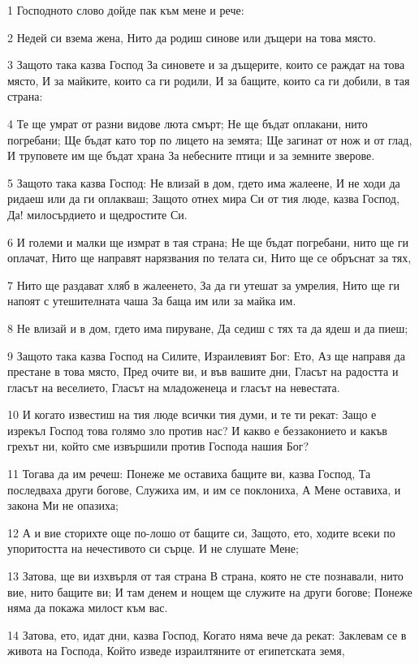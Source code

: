 \par 1 Господното слово дойде пак към мене и рече:
\par 2 Недей си взема жена, Нито да родиш синове или дъщери на това място.
\par 3 Защото така казва Господ За синовете и за дъщерите, които се раждат на това място, И за майките, които са ги родили, И за бащите, които са ги добили, в тая страна:
\par 4 Те ще умрат от разни видове люта смърт; Не ще бъдат оплакани, нито погребани; Ще бъдат като тор по лицето на земята; Ще загинат от нож и от глад, И труповете им ще бъдат храна За небесните птици и за земните зверове.
\par 5 Защото така казва Господ: Не влизай в дом, гдето има жалеене, И не ходи да ридаеш или да ги оплакваш; Защото отнех мира Си от тия люде, казва Господ, Да! милосърдието и щедростите Си.
\par 6 И големи и малки ще измрат в тая страна; Не ще бъдат погребани, нито ще ги оплачат, Нито ще направят нарязвания по телата си, Нито ще се обръснат за тях,
\par 7 Нито ще раздават хляб в жалеенето, За да ги утешат за умрелия, Нито ще ги напоят с утешителната чаша За баща им или за майка им.
\par 8 Не влизай и в дом, гдето има пируване, Да седиш с тях та да ядеш и да пиеш;
\par 9 Защото така казва Господ на Силите, Израилевият Бог: Ето, Аз ще направя да престане в това място, Пред очите ви, и във вашите дни, Гласът на радостта и гласът на веселието, Гласът на младоженеца и гласът на невестата.
\par 10 И когато известиш на тия люде всички тия думи, и те ти рекат: Защо е изрекъл Господ това голямо зло против нас? И какво е беззаконието и какъв грехът ни, който сме извършили против Господа нашия Бог?
\par 11 Тогава да им речеш: Понеже ме оставиха бащите ви, казва Господ, Та последваха други богове, Служиха им, и им се поклониха, А Мене оставиха, и закона Ми не опазиха;
\par 12 А и вие сторихте още по-лошо от бащите си, Защото, ето, ходите всеки по упоритостта на нечестивото си сърце. И не слушате Мене;
\par 13 Затова, ще ви изхвърля от тая страна В страна, която не сте познавали, нито вие, нито бащите ви; И там денем и нощем ще служите на други богове; Понеже няма да покажа милост към вас.
\par 14 Затова, ето, идат дни, казва Господ, Когато няма вече да рекат: Заклевам се в живота на Господа, Който изведе израилтяните от египетската земя,
